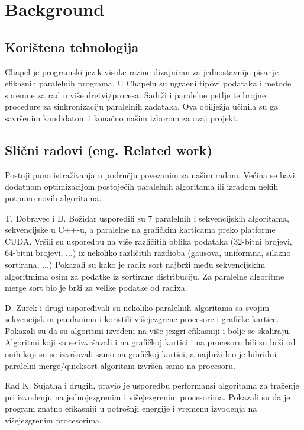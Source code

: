 \documentclass[conference]{IEEEtran}
\begin{document}
\section{Background}

\subsection{Korištena tehnologija}

Chapel je programski jezik visoke razine dizajniran za jednostavnije pisanje efikasnih paralelnih programa. U Chapelu su ugra\dj eni tipovi podataka i metode spremne za rad u više dretvi/procesa. Sadrži i paralelne petlje te brojne procedure za sinkronizaciju paralelnih zadataka. Ova obilježja učinila su ga savršenim kandidatom i konačno našim izborom za ovaj projekt.  

\subsection{Slični radovi (eng. Related work)}
Postoji puno istraživanja u području povezanim sa našim radom. Većina se bavi dodatnom optimizacijom postojećih paralelnih algoritama ili izradom nekih potpuno novih algoritama.

T. Dobravec i D. Božidar usporedili su 7 paralelnih i sekvencijskih algoritama, sekvencijske u C++-u, a paralelne na grafičkim karticama preko platforme CUDA\cite{b1}. Vršili su usporedbu na više različitih oblika podataka (32-bitni brojevi, 64-bitni brojevi, ...) iz nekoliko različitih razdioba (gausova, uniformna, silazno sortirana, ...) Pokazali su kako je radix sort najbrži među sekvencijskim algoritmima osim za podatke iz sortirane distribuciju. Za paralelne algoritme merge sort bio je brži za velike podatke od radixa.

D. Zurek i drugi uspoređivali su nekoliko paralelnih algoritama sa svojim sekvencijskim pandanima i koristili višejezgrene procesore i grafičke kartice\cite{b2}. Pokazali su da su algoritmi izvedeni na više jezgri efikasniji i bolje se skaliraju. Algoritmi koji su se izvršavali i na grafičkoj kartici i na procesoru bili su brži od onih koji su se izvršavali samo na grafičkoj kartici, a najbrži bio je hibridni paralelni merge/quicksort algoritam izvršen samo na procesoru.

Rad K. Sujatha i drugih, pravio je usporedbu performansi algoritama za traženje pri izvođenju na jednojezgrenim i višejezgrenim procesorima\cite{b3}. Pokazali su da je program znatno efikasniji u potrošnji energije i vremenu izvođenja na višejezgrenim procesorima.
\end{document}
